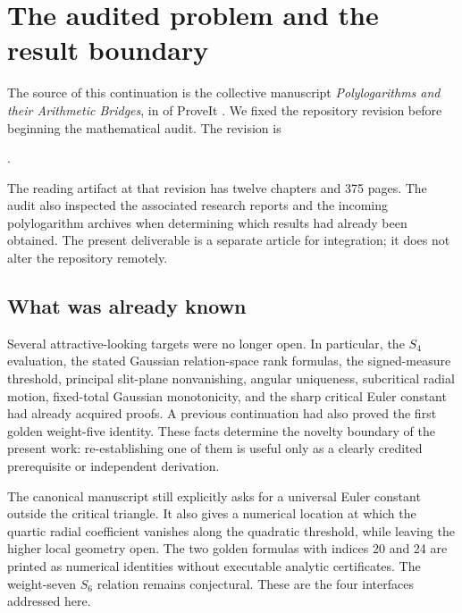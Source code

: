 \section{The audited problem and the result boundary}
\label{sec:scope}

The source of this continuation is the collective manuscript
\emph{Polylogarithms and their Arithmetic Bridges}, in
 of ProveIt
\cite{Repo}. We fixed the repository revision before beginning the
mathematical audit. The revision is
\begin{center}\baseline.\end{center}
The reading artifact at that revision has twelve chapters and 375 pages.
The audit also inspected the associated research reports and the incoming
polylogarithm archives when determining which results had already been
obtained. The present deliverable is a separate article for integration;
it does not alter the repository remotely.

\subsection{What was already known}

Several attractive-looking targets were no longer open. In particular,
the $S_4$ evaluation, the stated Gaussian relation-space rank formulas,
the signed-measure threshold, principal slit-plane nonvanishing,
angular uniqueness, subcritical radial motion, fixed-total Gaussian
monotonicity, and the sharp critical Euler constant had already acquired
proofs. A previous continuation had also proved the first golden
weight-five identity. These facts determine the novelty boundary of
the present work: re-establishing one of them is useful only as a
clearly credited prerequisite or independent derivation.

The canonical manuscript still explicitly asks for a universal Euler
constant outside the critical triangle. It also gives a numerical
location at which the quartic radial coefficient vanishes along the
quadratic threshold, while leaving the higher local geometry open.
The two golden formulas with indices 20 and 24 are printed as numerical
identities without executable analytic certificates. The weight-seven
$S_6$ relation remains conjectural. These are the four interfaces
addressed here.

